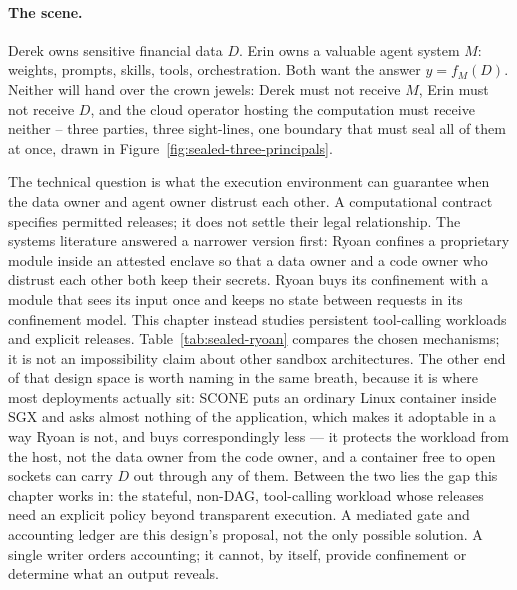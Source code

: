 \documentclass[11pt,a4paper]{article}
\theoremstyle{definition}
\begin{document}
\paragraph{The scene.}
Derek owns sensitive financial data $D$. Erin owns a valuable agent system $M$:
weights, prompts, skills, tools, orchestration. Both want the answer
$y=f_M(D)$. Neither will hand over the crown jewels: Derek must not receive $M$,
Erin must not receive $D$, and the cloud operator hosting the computation must
receive neither -- three parties, three sight-lines, one boundary that must
seal all of them at once, drawn in Figure~\ref{fig:sealed-three-principals}.

The technical question is what the execution environment can guarantee when
the data owner and agent owner distrust each other. A computational contract
specifies permitted releases; it does not settle their legal relationship.
The systems literature answered a narrower version first: Ryoan
 confines a proprietary module inside an attested enclave so that
a data owner and a code owner who distrust each other both keep their secrets.
Ryoan buys its confinement with a module that sees its input once and keeps no
state between requests in its confinement model. This chapter instead studies
persistent tool-calling workloads and explicit releases. Table~\ref{tab:sealed-ryoan}
compares the chosen mechanisms; it is not an impossibility claim about other
sandbox architectures.
The other end of that design space is worth naming in the same breath, because it
is where most deployments actually sit: SCONE  puts an ordinary
Linux container inside SGX and asks almost nothing of the application, which makes
it adoptable in a way Ryoan is not, and buys correspondingly less --- it protects
the workload from the host, not the data owner from the code owner, and a
container free to open sockets can carry $D$ out through any of them. Between the
two lies the gap this chapter works in: the stateful, non-DAG, tool-calling
workload whose releases need an explicit policy beyond transparent execution.
A mediated gate and accounting ledger are this design's proposal, not the only
possible solution. A single writer orders accounting; it cannot, by itself,
provide confinement or determine what an output reveals.
\end{document}
